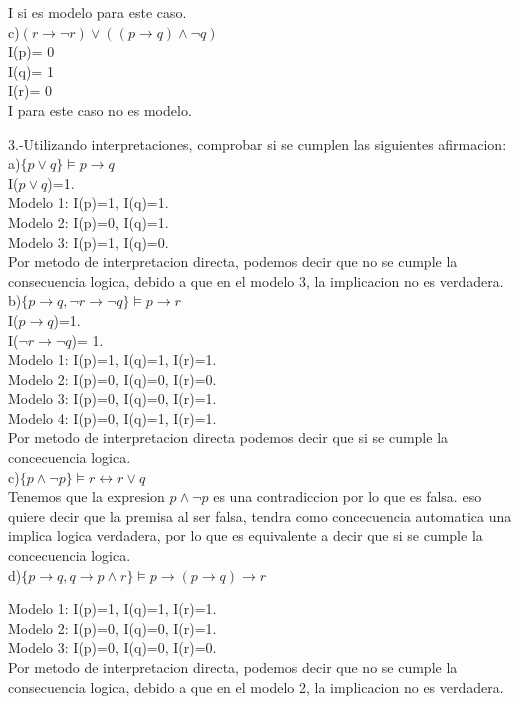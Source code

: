 \documentclass[paper=letter, fontsize=12pt]{scrartcl}
\begin{document}
I si es modelo para este caso.\\

c)$(r\rightarrow \neg r) \vee ((p \rightarrow q)\wedge \neg q) $\\

I(p)= 0\\
I(q)= 1\\
I(r)= 0\\

I para este caso no es modelo.

3.-Utilizando interpretaciones, comprobar si se cumplen las siguientes afirmacion:\\

a)$\{p \vee q\} \models p\rightarrow q$\\
I($p\vee q$)=1.\\

Modelo 1: I(p)=1, I(q)=1.\\
Modelo 2: I(p)=0, I(q)=1.\\
Modelo 3: I(p)=1, I(q)=0.\\

Por metodo de interpretacion directa, podemos decir que no se cumple la consecuencia logica, debido a que en el modelo 3, la implicacion no es verdadera.\\

b)$\{ p\rightarrow q, \neg r \rightarrow \neg q \} \models p\rightarrow r$\\
I($p\rightarrow q$)=1.\\
I($\neg r\rightarrow \neg q$)= 1.\\

Modelo 1: I(p)=1, I(q)=1, I(r)=1.\\
Modelo 2: I(p)=0, I(q)=0, I(r)=0.\\
Modelo 3: I(p)=0, I(q)=0, I(r)=1.\\
Modelo 4: I(p)=0, I(q)=1, I(r)=1.\\

Por metodo de interpretacion directa podemos decir que si se cumple la concecuencia logica.\\

c)$\{ p \wedge \neg p \} \models r\leftrightarrow r\vee q$\\
Tenemos que la expresion $p\wedge \neg p $ es una contradiccion por lo que es falsa. eso quiere decir que la premisa al ser falsa, tendra como concecuencia automatica una implica logica verdadera, por lo que es equivalente a decir que si se cumple la concecuencia logica.\\

d)$\{ p\rightarrow q, q\rightarrow p \wedge r\}\models p\rightarrow (p\rightarrow q) \rightarrow r$

Modelo 1: I(p)=1, I(q)=1, I(r)=1.\\
Modelo 2: I(p)=0, I(q)=0, I(r)=1.\\
Modelo 3: I(p)=0, I(q)=0, I(r)=0.\\

Por metodo de interpretacion directa, podemos decir que no se cumple la consecuencia logica, debido a que en el modelo 2, la implicacion no es verdadera.\\
\end{document}
